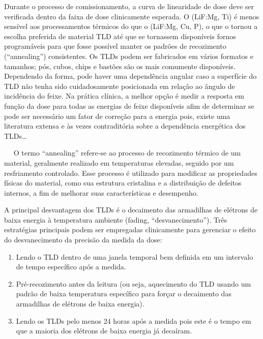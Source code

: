 \documentclass[11pt,a4paper]{article}
\begin{document}
	Durante o processo de comissionamento, a curva de linearidade de dose deve ser verificada dentro da faixa de dose clinicamente esperada. O (LiF:Mg, Ti) é menos sensível aos processamentos térmicos do que o (LiF:Mg, Cu, P), o que o tornou a escolha preferida de material TLD até que se tornassem disponíveis fornos programáveis para que fosse possível manter os padrões de recozimento (``annealing'') consistentes. Os TLDs podem ser fabricados em vários formatos e tamanhos; pós, cubos, chips e bastões são os mais comumente disponíveis. Dependendo da forma, pode haver uma dependência angular caso a superfície do TLD não tenha sido cuidadosamente posicionada em relação ao ângulo de incidência do feixe.  Na prática clínica, a melhor opção é medir a resposta em função da dose para todas as energias de feixe disponíveis afim de determinar se pode ser necessário um fator de correção para a energia pois, existe uma literatura extensa e às vezes contraditória sobre a dependência energética dos TLDs\dots



	\begin{tcolorbox}[width=\textwidth, colback={white}, colbacktitle={DarkTurquoise!50!white}, title={$\bigstar$ \LobsterTwo{Nota:} $\bigstar $}, coltitle={CarnationPink}, colframe={DarkTurquoise}, fonttitle=\rmfamily\bfseries\Large]
		$\quad$ O termo ``annealing'' refere-se ao processo de recozimento térmico de um material, geralmente realizado em temperaturas elevadas, seguido por um resfriamento controlado. Esse processo é utilizado para modificar as propriedades físicas do material, como sua estrutura cristalina e a distribuição de defeitos internos, a fim de melhorar suas características e desempenho. 
	\end{tcolorbox}

	A principal desvantagem dos TLDs é o decaimento das armadilhas de elétrons de baixa energia à temperatura ambiente (fading, ``desvanecimento''). Três estratégias principais podem ser empregadas clinicamente para gerenciar o efeito do desvanecimento da precisão da medida da dose:

	\begin{enumerate}[label=\textcolor{CarnationPink}{\arabic*${}^\circ $}]
		\item Lendo o TLD dentro de uma janela temporal bem definida em um intervalo de tempo específico após a medida.
		\item Pré-recozimento antes da leitura (ou seja, aquecimento do TLD usando um padrão de baixa temperatura específico para forçar o decaimento das armadilhas de elétrons de baixa energia).
		\item Lendo os TLDs pelo menos 24 horas após a medida pois este é o tempo em que a maioria dos elétrons de baixa energia já decaíram.
	\end{enumerate}
\end{document}
